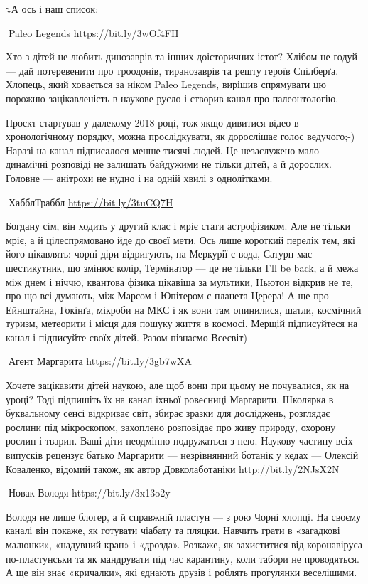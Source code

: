 ⤵️А ось і наш список:

🦉Paleo Legends \url{https://bit.ly/3wOf4FH}

Хто з дітей не любить динозаврів та інших доісторичних істот? Хлібом не годуй — дай потеревенити про троодонів, тиранозаврів та решту героїв Спілберґа. Хлопець, який ховається за ніком Paleo Legends, вирішив спрямувати цю порожню зацікавленість в наукове русло і створив канал про палеонтологію.

Проєкт стартував у далекому 2018 році, тож якщо дивитися відео в хронологічному порядку, можна прослідкувати, як дорослішає голос ведучого;-) Наразі на канал підписалося менше тисячі людей. Це незаслужено мало — динамічні розповіді не залишать байдужими не тільки дітей, а й дорослих. Головне — анітрохи не нудно і на одній хвилі з однолітками.

🦉ХабблТраббл \url{https://bit.ly/3tuCQ7H}

Богдану сім, він ходить у другий клас і мріє стати астрофізиком. Але не тільки мріє, а й цілеспрямовано йде до своєї мети. Ось лише короткий перелік тем, які його цікавлять: чорні діри відригують, на Меркурії є вода, Сатурн має шестикутник, що змінює колір, Термінатор — це не тільки I'll be back, а й межа між днем і ніччю, квантова фізика цікавіша за мультики, Ньютон відкрив не те, про що всі думають, між Марсом і Юпітером є планета-Церера! А ще про Ейнштайна, Гокінґа, мікроби на МКС і як вони там опинилися, шатли, космічний туризм, метеорити і місця для пошуку життя в космосі. Мерщій підписуйтеся на канал і підписуйте своїх дітей. Разом пізнаємо Всесвіт)

🦉Агент Маргарита https://bit.ly/3gb7wXA

Хочете зацікавити дітей наукою, але щоб вони при цьому не почувалися, як на уроці? Тоді підпишіть їх на канал їхньої ровесниці Маргарити. Школярка в буквальному сенсі відкриває світ, збирає зразки для досліджень, розглядає рослини під мікроскопом, захоплено розповідає про живу природу, охорону рослин і тварин. Ваші діти неодмінно подружаться з нею. Наукову частину всіх випусків рецензує батько Маргарити — незрівнянний ботанік у кедах — Олексій Коваленко, відомий також, як автор Довколаботаніки http://bit.ly/2NJsX2N

🦉Новак Володя https://bit.ly/3x13o2y 

Володя не лише блогер, а й справжній пластун — з рою Чорні хлопці. На своєму каналі він покаже, як готувати чіабату та пляцки. Навчить грати в «загадкові малюнки», «надувний кран» і «дрозда». Розкаже, як захиститися від коронавіруса по-пластунськи та як мандрувати під час карантину, коли табори не проводяться. А ще він знає «кричалки», які єднають друзів і роблять прогулянки веселішими.

